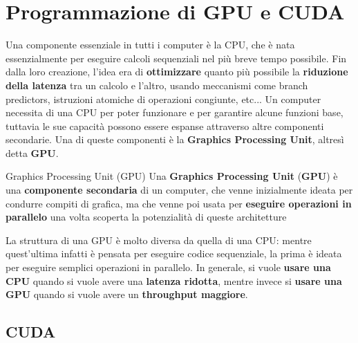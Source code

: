 \chapter{Programmazione di GPU e CUDA}

Una componente essenziale in tutti i computer è la CPU, che è nata essenzialmente per eseguire calcoli sequenziali nel più breve tempo possibile. Fin dalla loro creazione, l'idea era di \textbf{ottimizzare} quanto più possibile la \textbf{riduzione della latenza} tra un calcolo e l'altro, usando meccanismi come branch predictors, istruzioni atomiche di operazioni congiunte, etc... Un computer necessita di una CPU per poter funzionare e per garantire alcune funzioni base, tuttavia le sue capacità possono essere espanse attraverso altre componenti secondarie. Una di queste componenti è la \textbf{Graphics Processing Unit}, altresì detta \textbf{GPU}.

\begin{definition}{Graphics Processing Unit (GPU)}
    Una \textbf{Graphics Processing Unit} (\textbf{GPU}) è una \textbf{componente secondaria} di un computer, che venne inizialmente ideata per condurre compiti di grafica, ma che venne poi usata per \textbf{eseguire operazioni in parallelo} una volta scoperta la potenzialità di queste architetture
\end{definition}

La struttura di una GPU è molto diversa da quella di una CPU: mentre quest'ultima infatti è pensata per eseguire codice sequenziale, la prima è ideata per eseguire semplici operazioni in parallelo. In generale, si vuole \textbf{usare una CPU} quando si vuole avere una \textbf{latenza ridotta}, mentre invece si \textbf{usare una GPU} quando si vuole avere un \textbf{throughput maggiore}.

\section{CUDA}

